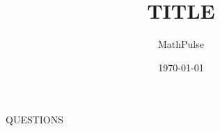 \documentclass[12pt,a4paper]{book}
\begin{document}
\title{{TITLE}}
\author{MathPulse}
\date{\today}
\maketitle
\tableofcontents
{QUESTIONS}
\end{document}
